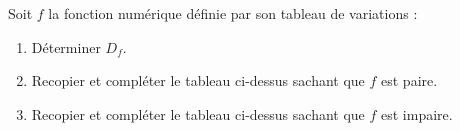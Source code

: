 \begin{Application}[][10 min]
Soit $f$ la fonction numérique définie par son tableau de variations :

\vspace{0.3cm}
\begin{center}
\end{center}
\vspace{0.2cm}

\begin{enumerate}
    \item Déterminer $D_f$.
    \item Recopier et compléter le tableau ci-dessus sachant que $f$ est paire.
    \item Recopier et compléter le tableau ci-dessus sachant que $f$ est impaire.
\end{enumerate}
\end{Application}
